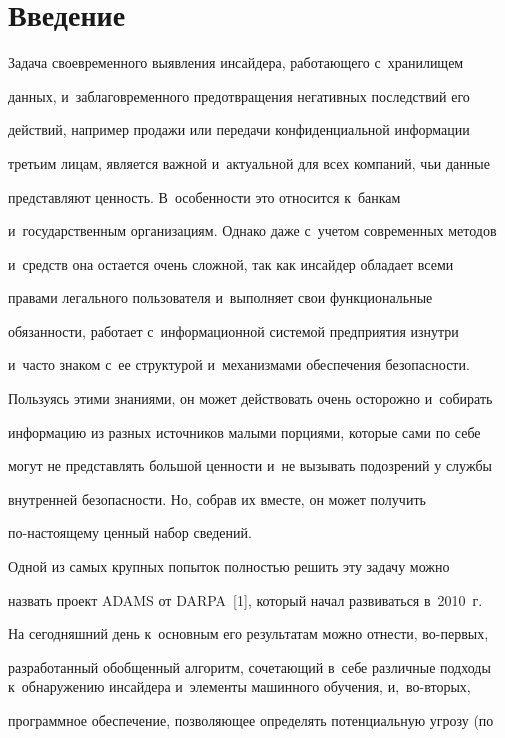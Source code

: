     \section{Введение}


    


  Задача своевременного выявления инсайдера, работающего с~хранилищем 


данных, и~заблаговременного предотвращения негативных последствий его 


действий, например продажи или передачи конфиденциальной информации 


третьим лицам, является важной и~актуальной для всех компаний, чьи данные 


представляют ценность. В~особенности это относится к~банкам 


и~государственным организациям. Однако даже с~учетом современных методов 


и~средств она остается очень сложной, так как инсайдер обладает всеми 


правами легального пользователя и~выполняет свои функциональные 


обязанности, работает с~информационной системой предприятия изнутри 


и~часто знаком с~ее структурой и~механизмами обеспечения безопасности. 


Пользуясь этими знаниями, он может действовать очень осторожно и~собирать 


информацию из разных источников малыми порциями, которые сами по себе 


могут не представлять большой ценности и~не вызывать подозрений у службы 


внутренней безопасности. Но, собрав их вместе, он может получить  


по-на\-сто\-яще\-му ценный набор сведений.


  


  Одной из самых крупных попыток полностью решить эту задачу можно 


назвать проект ADAMS от DARPA~[1], который начал развиваться в~2010~г. 


На сегодняшний день к~основным его результатам можно отнести, во-пер\-вых, 


разработанный обобщенный алгоритм, сочетающий в~себе различные подходы к~обнаружению инсайдера и~элементы машинного обучения, и,~во-вто\-рых, 


программное обеспечение, позволяющее определять потенциальную угрозу (по 


